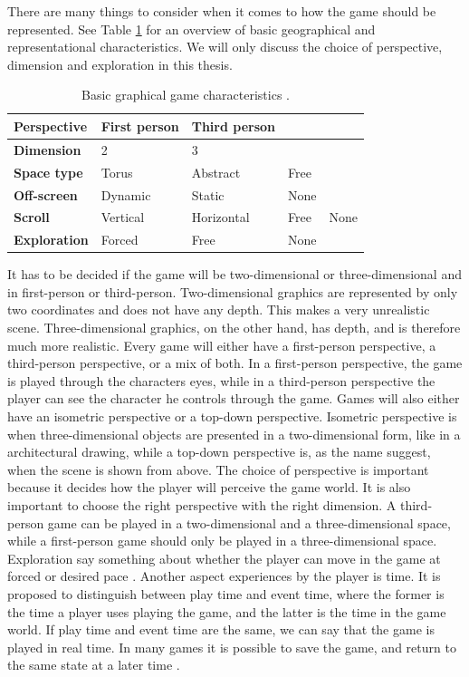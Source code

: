 There are many things to consider when it comes to how the game should be represented. See Table \ref{tab:graphic} for an overview of basic geographical and representational characteristics. We will only discuss the choice of perspective, dimension and exploration in this thesis. 

\begin{table}
\centering
    \begin{tabular}{|l|l|l|l|l|}
        \hline
       \textbf{Perspective} & First person & Third person & &  \\ \hline
       \textbf{Dimension} & 2 & 3 & & \\ \hline
       \textbf{Space type} & Torus & Abstract & Free & \\ \hline
	   \textbf{Off-screen} & Dynamic & Static & None & \\ \hline
	   \textbf{Scroll} & Vertical & Horizontal & Free & None \\ \hline
	   \textbf{Exploration} & Forced & Free & None & \\
        \hline
    \end{tabular}
    \caption[Graphical Characteristics]{Basic graphical game characteristics \cite{understandingvg}.}
    \label{tab:graphic}
\end{table} 

It has to be decided if the game will be two-dimensional or three-dimensional and in first-person or third-person. Two-dimensional graphics are represented by only two coordinates and does not have any depth. This makes a very unrealistic scene. Three-dimensional graphics, on the other hand, has depth, and is therefore much more realistic. Every game will either have a first-person perspective, a third-person perspective, or a mix of both. In a first-person perspective, the game is played through the characters eyes, while in a third-person perspective the player can see the character he controls through the game. Games will also either have an isometric perspective or a top-down perspective. Isometric perspective is when three-dimensional objects are presented in a two-dimensional form, like in a architectural drawing, while a top-down perspective is, as the name suggest, when the scene is shown from above. The choice of perspective is important because it decides how the player will perceive the game world. It is also important to choose the right perspective with the right dimension. A third-person game can be played in a two-dimensional and a three-dimensional space, while a first-person game should only be played in a three-dimensional space. Exploration say something about whether the player can move in the game at forced or desired pace \cite{understandingvg}. Another aspect experiences by the player is time. It is proposed to distinguish between play time and event time, where the former is the time a player uses playing the game, and the latter is the time in the game world. If play time and event time are the same, we can say that the game is played in real time. In many games it is possible to save the game, and return to the same state at a later time \cite{understandingvg}.

